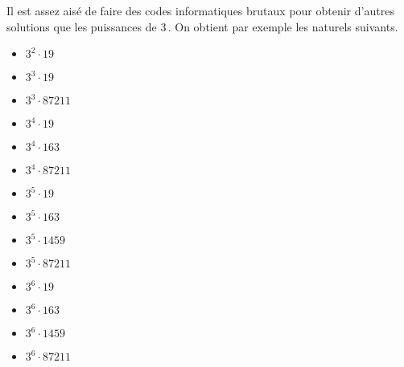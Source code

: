 Il est assez aisé de faire des codes informatiques brutaux pour obtenir d'autres solutions que les puissances de $3$\,. On obtient par exemple les naturels suivants.
\begin{multicols}{5}
    \begin{itemize}
    	\item $3^2 \cdot 19$
    \end{itemize}
    
    \vfill\null
    \columnbreak

    \begin{itemize}
    	\item $3^3 \cdot 19$
    	\item $3^3 \cdot \num{87211}$
    \end{itemize}
    
    \vfill\null
    \columnbreak

    \begin{itemize}    
    	\item $3^4 \cdot 19$
    	\item $3^4 \cdot 163$
    	\item $3^4 \cdot \num{87211}$
    \end{itemize}
    
    \vfill\null
    \columnbreak

    \begin{itemize}
    	\item $3^5 \cdot 19$
    	\item $3^5 \cdot 163$    
    	\item $3^5 \cdot 1459$
    	\item $3^5 \cdot \num{87211}$
    \end{itemize}
    
    \vfill\null
    \columnbreak

    \begin{itemize}
    	\item $3^6 \cdot 19$
    	\item $3^6 \cdot 163$    
    	\item $3^6 \cdot 1459$
    	\item $3^6 \cdot \num{87211}$
    \end{itemize}
    
    \vfill\null
\end{multicols}

